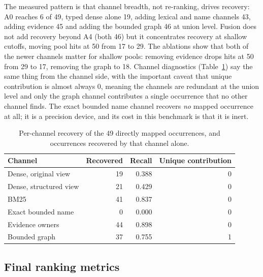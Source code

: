\documentclass[11pt,a4paper]{article}
\begin{document}
The measured pattern is that channel breadth, not re-ranking, drives recovery: A0 reaches 6 of 49, typed dense alone 19, adding lexical and name channels 43, adding evidence 45 and adding the bounded graph 46 at union level. Fusion does not add recovery beyond A4 (both 46) but it concentrates recovery at shallow cutoffs, moving pool hits at 50 from 17 to 29. The ablations show that both of the newer channels matter for shallow pools: removing evidence drops hits at 50 from 29 to 17, removing the graph to 18. Channel diagnostics (Table~\ref{tab:channels}) say the same thing from the channel side, with the important caveat that unique contribution is almost always 0, meaning the channels are redundant at the union level and only the graph channel contributes a single occurrence that no other channel finds. The exact bounded name channel recovers \emph{no} mapped occurrence at all; it is a precision device, and its cost in this benchmark is that it is inert.

\begin{table}[htbp]
\centering
\footnotesize
\caption{Per-channel recovery of the 49 directly mapped occurrences, and occurrences recovered by that channel alone.}
\label{tab:channels}
\begin{tabular}{@{}lrrr@{}}
\toprule
Channel & Recovered & Recall & Unique contribution \\
\midrule
Dense, original view & 19 & 0.388 & 0 \\
Dense, structured view & 21 & 0.429 & 0 \\
BM25 & 41 & 0.837 & 0 \\
Exact bounded name & 0 & 0.000 & 0 \\
Evidence owners & 44 & 0.898 & 0 \\
Bounded graph & 37 & 0.755 & 1 \\
\bottomrule
\end{tabular}
\end{table}

\subsection{Final ranking metrics}
\end{document}
